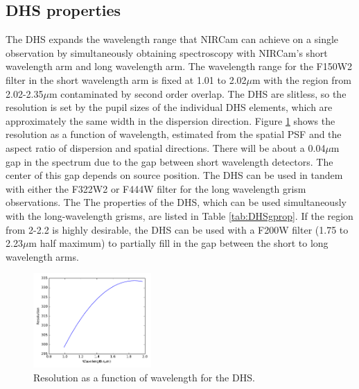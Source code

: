 \documentclass[iop]{emulateapj}
\begin{document}
\subsection{DHS properties}
The DHS expands the wavelength range that NIRCam can achieve on a single observation by simultaneously obtaining spectroscopy with NIRCam's short wavelength arm and long wavelength arm.
The wavelength range for the F150W2 filter in the short wavelength arm is fixed at 1.01 to 2.02$\mu$m with the region from 2.02-2.35$\mu$m contaminated by second order overlap.
The DHS are slitless, so the resolution is set by the pupil sizes of the individual DHS elements, which are approximately the same width in the dispersion direction.
Figure \ref{fig:DHSRes} shows the resolution as a function of wavelength, estimated from the spatial PSF and the aspect ratio of dispersion and spatial directions.
There will be about a 0.04$\mu$m gap in the spectrum due to the gap between short wavelength detectors.
The center of this gap depends on source position.
The DHS can be used in tandem with either the F322W2 or F444W filter for the long wavelength grism observations.
The The properties of the DHS, which can be used simultaneously with the long-wavelength grisms, are listed in Table \ref{tab:DHSgprop}.
If the region from 2-2.2 is highly desirable, the DHS can be used with a F200W filter (1.75 to 2.23$\mu$m half maximum) to partially fill in the gap between the short to long wavelength arms.

\begin{figure}[!ht]
\centering
\includegraphics[width=0.4\textwidth]{dhs_res.pdf}
\caption{Resolution as a function of wavelength for the DHS.}\label{fig:DHSRes}
\end{figure}
\end{document}
